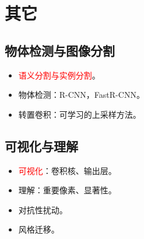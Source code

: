\documentclass[
12pt, %
a4paper, 
oneside, %
]{scrartcl}
\begin{document}
\section{其它}
\subsection[物体检测与图像分割]{物体检测与图像分割}
\begin{itemize}
\item \textcolor{red}{语义分割与实例分割}。
\item 物体检测：R-CNN，FastR-CNN。
\item 转置卷积：可学习的上采样方法。
\end{itemize}
\subsection[可视化与理解]{可视化与理解}
\begin{itemize}
\item \textcolor{red}{可视化}：卷积核、输出层。
\item 理解：重要像素、显著性。
\item 对抗性扰动。
\item 风格迁移。
\end{itemize}
\end{document}
